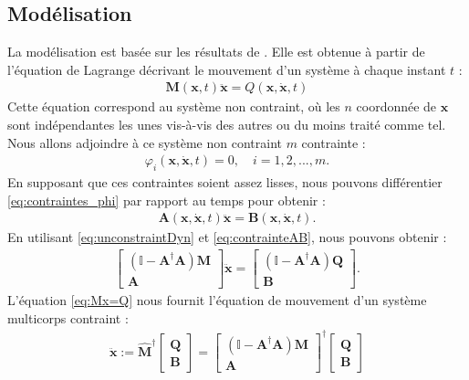 \subsection{Modélisation}
La modélisation est basée sur les résultats de \cite[Équation (2.15)]{udwadia-phohomsiri}. 
Elle est obtenue à partir de l'équation de Lagrange décrivant le mouvement d'un système à chaque instant $t$ :
\begin{align}
    \label{eq:unconstraintDyn}
    \boldsymbol{M}(\boldsymbol{x},t) \ddot{\boldsymbol{x}} = Q(\boldsymbol{x}, \dot{\boldsymbol{x}}, t)
\end{align}
Cette équation correspond au système non contraint, où les $n$ coordonnée de $\boldsymbol{x}$ sont indépendantes les unes vis-à-vis des autres ou du moins traité comme tel. Nous allons adjoindre à ce système non contraint $m$ contrainte :
\begin{align}
    \label{eq:contraintes_phi}
    \varphi_{i}(\boldsymbol{x},\dot{\boldsymbol{x}},t) = 0, \quad i=1,2,...,m.
\end{align}
En supposant que ces contraintes soient assez lisses, nous pouvons différentier \eqref{eq:contraintes_phi} par rapport au temps pour obtenir : 
\begin{align}
    \label{eq:contrainteAB}
    \boldsymbol{A}(\boldsymbol{x},\dot{\boldsymbol{x}}, t) \ddot{\boldsymbol{x}} = \boldsymbol{B}(\boldsymbol{x},\dot{\boldsymbol{x}},t).
\end{align}
En utilisant \eqref{eq:unconstraintDyn} et \eqref{eq:contrainteAB}, nous pouvons obtenir :
\begin{align}
    \label{eq:Mx=Q}
    \begin{bmatrix} (\mathbb{I} - \boldsymbol{A}^{\dag}\boldsymbol{A})\boldsymbol{M} \\ \boldsymbol{A} \end{bmatrix}  \ddot{\boldsymbol{x}}  =  \begin{bmatrix} (\mathbb{I} - \boldsymbol{A}^{\dag}\boldsymbol{A}) \boldsymbol{Q} \\ \boldsymbol{B} \end{bmatrix}.
\end{align}
 L'équation \eqref{eq:Mx=Q} nous fournit l'équation de mouvement d'un système multicorps contraint : 
\begin{align}
\label{eq:udwadia}
    \ddot{\boldsymbol{x}} := \hat{\boldsymbol{M}}^{\dag} \begin{bmatrix} \boldsymbol{Q} \\ \boldsymbol{B} \end{bmatrix}  = \begin{bmatrix} (\mathbb{I} - \boldsymbol{A}^{\dag}\boldsymbol{A})\boldsymbol{M} \\ \boldsymbol{A} \end{bmatrix}^{\dag} \begin{bmatrix} \boldsymbol{Q} \\ \boldsymbol{B} \end{bmatrix}
\end{align}
